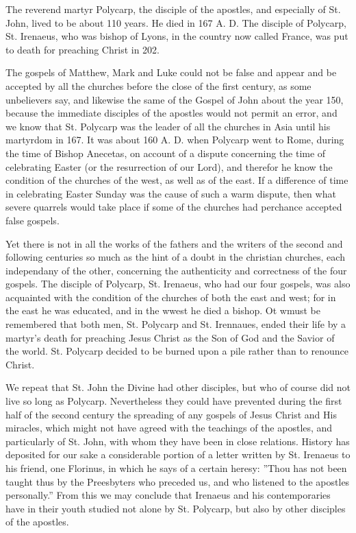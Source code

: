 The reverend martyr Polycarp, the disciple of the apostles, and especially of St. John, lived to be about 110 years. He died in 167 A. D. The disciple of Polycarp, St. Irenaeus, who was bishop of Lyons, in the country now called France, was put to death for preaching Christ in 202.

The gospels of Matthew, Mark and Luke could not be false and appear and be accepted by all the churches before the close of the first century, as some unbelievers say, and likewise the same of the Gospel of John about the year 150, because the immediate disciples of the apostles would not permit an error, and we know that St. Polycarp was the leader of all the churches in Asia until his martyrdom in 167. It was about 160 A. D. when Polycarp went to Rome, during the time of Bishop Anecetas, on account of a dispute concerning the time of celebrating Easter (or the resurrection of our Lord), and therefor he know the condition of the churches of the west, as well as of the east. If a difference of time in celebrating Easter Sunday was the cause of such a warm dispute, then what severe quarrels would take place if some of the churches had perchance accepted false gospels.

Yet there is not in all the works of the fathers and the writers of the second and following centuries so much as the hint of a doubt in the christian churches, each independany of the other, concerning the authenticity and correctness of the four gospels. The disciple of Polycarp, St. Irenaeus, who had our four gospels, was also acquainted with the condition of the churches of both the east and west; for in the east he was educated, and in the wwest he died a bishop. Ot wmust be remembered that both men, St. Polycarp and St. Irennaues, ended their life by a martyr's death for preaching Jesus Christ as the Son of God and the Savior of the world. St. Polycarp decided to be burned upon a pile rather than to renounce Christ.

We repeat that St. John the Divine had other disciples, but who of course did not live so long as Polycarp. Nevertheless they could have prevented during the first half of the second century the spreading of any gospels of Jesus Christ and His miracles, which might not have agreed with the teachings of the apostles, and particularly of St. John, with whom they have been in close relations. History has deposited for our sake a considerable portion of a letter written by St. Irenaeus to his friend, one Florinus, in which he says of a certain heresy: ''Thou has not been taught thus by the Preesbyters who preceded us, and who listened to the apostles personally.'' From this we may conclude that Irenaeus and his contemporaries have in their youth studied not alone by St. Polycarp, but also by other disciples of the apostles.

